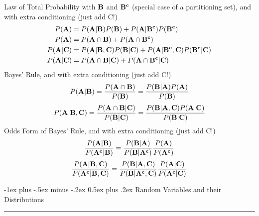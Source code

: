 \documentclass[10pt,landscape]{article}
\makeatletter
\renewcommand{\section}{\@startsection{section}{1}{0mm}%
                                {-1ex plus -.5ex minus -.2ex}%
                                {0.5ex plus .2ex}%
                                {\normalfont\large\bfseries}}
\renewcommand{\subsection}{\@startsection{subsection}{2}{0mm}%
                                {-1explus -.5ex minus -.2ex}%
                                {0.5ex plus .2ex}%
                                {\normalfont\normalsize\bfseries}}
\makeatother
\begin{document}
\begin{multicols}{3}
Law of Total Probability with ${\bf B}$ and ${\bf B^c}$ (special case of a partitioning set), and with extra conditioning (just add C!)
   \begin{align*} 
P({\bf A}) &= P({\bf A} | {\bf B})P({\bf B}) + P({\bf A} | {\bf B^c})P({\bf B^c}) \\
P({\bf A}) &= P({\bf A} \cap {\bf B})+ P({\bf A} \cap {\bf B^c}) \\
P({\bf A} | {\bf C}) &= P({\bf A} | {\bf B}, {\bf C})P({\bf B} | {\bf C}) + P({\bf A} | {\bf B^c}, {\bf C})P({\bf B^c} | {\bf C}) \\
P({\bf A} | {\bf C}) &= P({\bf A} \cap {\bf B} | {\bf C})+ P({\bf A} \cap {\bf B^c} | {\bf C})
   \end{align*} 
Bayes' Rule, and with extra conditioning (just add C!)
         \[P({\bf A}|{\bf B}) = \frac{P({\bf A} \cap {\bf B})}{P({\bf B})} = \frac{P({\bf B}|{\bf A})P({\bf A})}{P({\bf B})}\]
         \[P({\bf A}|{\bf B}, {\bf C}) = \frac{P({\bf A} \cap {\bf B} | {\bf C})}{P({\bf B} | {\bf C})} = \frac{P({\bf B}|{\bf A}, {\bf C})P({\bf A} | {\bf C})}{P({\bf B} | {\bf C})}\]
Odds Form of Bayes' Rule, and with extra conditioning (just add C!)
\[\frac{P({\bf A}| {\bf B})}{P({\bf A^c}| {\bf B})} = \frac{P({\bf B}|{\bf A})}{P({\bf B}| {\bf A^c})}\frac{P({\bf A})}{P({\bf A^c})}\]
\[\frac{P({\bf A}| {\bf B}, {\bf C})}{P({\bf A^c}| {\bf B}, {\bf C})} = \frac{P({\bf B}|{\bf A}, {\bf C})}{P({\bf B}| {\bf A^c}, {\bf C})}\frac{P({\bf A} | {\bf C})}{P({\bf A^c} | {\bf C})}\]

\section{Random Variables and their Distributions}\smallskip \hrule height 2pt \smallskip


   

\end{multicols}
\end{document}
